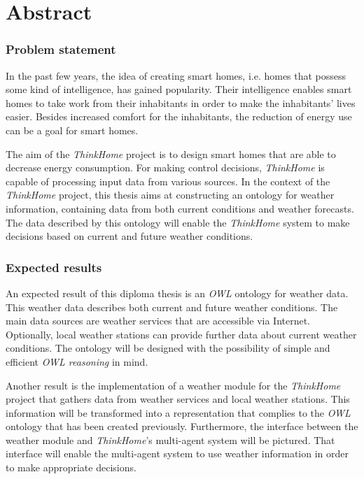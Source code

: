 \chapter*{Abstract}

\subsection*{Problem statement}
In the past few years, the idea of creating smart homes, i.e. homes that possess some kind of intelligence, has gained popularity.
Their intelligence enables smart homes to take work from their inhabitants in order to make the inhabitants' lives easier.
Besides increased comfort for the inhabitants, the reduction of energy use can be a goal for smart homes.

The aim of the \textit{ThinkHome} project \cite{CR2011-TH_Journal} \cite{CR2010-DEST_ThinkHome} is to design smart homes that are able to decrease energy consumption.
For making control decisions, \textit{ThinkHome} is capable of processing input data from various sources.
In the context of the \textit{ThinkHome} project, this thesis aims at constructing an ontology for weather information, containing data from both current conditions and weather forecasts.
The data described by this ontology will enable the \textit{ThinkHome} system to make decisions based on current and future weather conditions.

\subsection*{Expected results}
An expected result of this diploma thesis is an \textit{OWL} ontology for weather data. This weather data describes both current and future weather conditions.
The main data sources are weather services that are accessible via Internet. Optionally, local weather stations can provide further data about current weather conditions.
The ontology will be designed with the possibility of simple and efficient \textit{OWL reasoning} in mind.

Another result is the implementation of a weather module for the \textit{ThinkHome} project that gathers data from weather services and local weather stations.
This information will be transformed into a representation that complies to the \textit{OWL} ontology that has been created previously.
Furthermore, the interface between the weather module and \textit{ThinkHome}'s multi-agent system will be pictured.
That interface will enable the multi-agent system to use weather information in order to make appropriate decisions.

